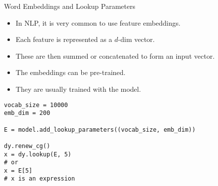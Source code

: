 \documentclass[compress]{beamer}
\begin{document}
\begin{frame}{Word Embeddings and Lookup Parameters}

\begin{itemize}
  \item In NLP, it is very common to use feature embeddings.
  \item Each feature is represented as a $d$-dim vector.
  \item These are then summed or concatenated to form an input vector.
  \item The embeddings can be pre-trained.
  \item They are usually trained with the model.
\end{itemize}

\end{frame}


\begin{frame}[fragile]{}

\begin{verbatim}
vocab_size = 10000
emb_dim = 200

E = model.add_lookup_parameters((vocab_size, emb_dim))

dy.renew_cg()
x = dy.lookup(E, 5)
# or
x = E[5]
# x is an expression
\end{verbatim}

\end{frame}


\end{document}
